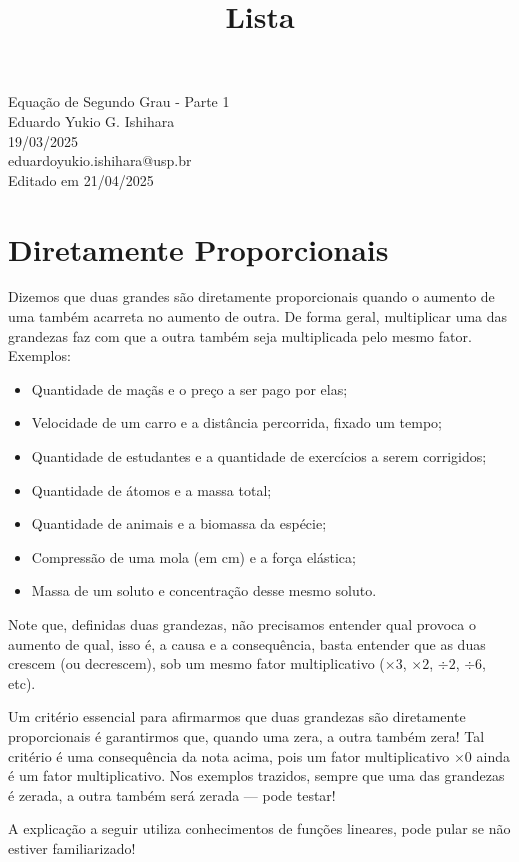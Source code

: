 \documentclass[12pt]{report}
\title{Lista}
\newcommand{\1}{\faThermometerEmpty}
\newcommand{\2}{\faThermometerQuarter}
\newcommand{\3}{\faThermometerHalf}
\newcommand{\4}{\faThermometerThreeQuarters}
\newcommand{\5}{\faThermometerFull}
\begin{document}
\begin{center}
{\Large Equação de Segundo Grau - Parte 1} \\ %
\vspace{1mm}
Eduardo Yukio G. Ishihara \\ 19/03/2025 \\ %
{\footnotesize eduardoyukio.ishihara@usp.br \\
Editado em 21/04/2025} %
\end{center}
\vspace{5mm}


\section*{Diretamente Proporcionais}
Dizemos que duas grandes são diretamente proporcionais quando o aumento de uma também acarreta no aumento de outra. De forma geral, multiplicar uma das grandezas faz com que a outra também seja multiplicada pelo mesmo fator.
Exemplos:
\begin{itemize}
    \item Quantidade de maçãs e o preço a ser pago por elas;
    \item Velocidade de um carro e a distância percorrida, fixado um tempo;
    \item Quantidade de estudantes e a quantidade de exercícios a serem corrigidos;
    \item Quantidade de átomos e a massa total;
    \item Quantidade de animais e a biomassa da espécie;
    \item Compressão de uma mola (em cm) e a força elástica;
    \item Massa de um soluto e concentração desse mesmo soluto.
\end{itemize}
Note que, definidas duas grandezas, não precisamos entender qual provoca o aumento de qual, isso é, a causa e a consequência, basta entender que as duas crescem (ou decrescem), sob um mesmo fator multiplicativo ($\times 3$, $\times 2$, $\div 2$, $\div 6$, etc).

Um critério essencial para afirmarmos que duas grandezas são diretamente proporcionais é garantirmos que, quando uma zera, a outra também zera! Tal critério é uma consequência da nota acima, pois um fator multiplicativo $\times 0$ ainda é um fator multiplicativo. Nos exemplos trazidos, sempre que uma das grandezas é zerada, a outra também será zerada — pode testar!

{\footnotesize A explicação a seguir utiliza conhecimentos de funções lineares, pode pular se não estiver familiarizado!}
\end{document}
